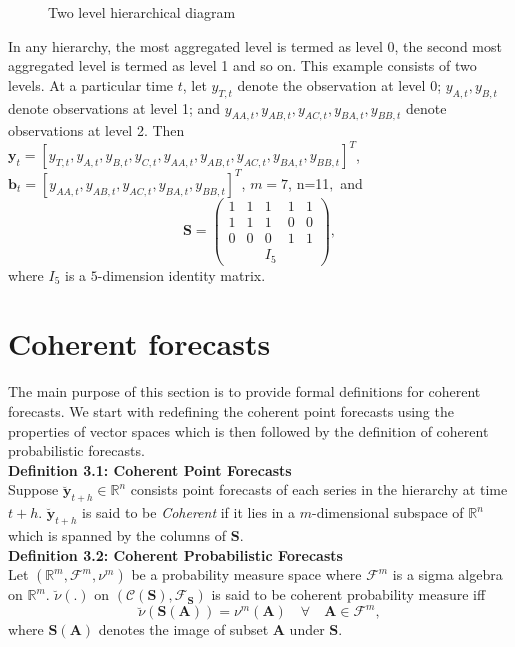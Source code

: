 \documentclass[a4paper, 11pt]{article}
\begin{document}
\begin{figure}
	\begin{center}
		  
		 
		\qobitree
	\end{center}
	\caption{Two level hierarchical diagram}
\end{figure}
\noindent
In any hierarchy, the most aggregated level is termed as level 0, the second most aggregated level is termed as level 1 and so on. This example consists of two levels. At a particular time $t$, let $y_{T,t}$ denote the observation at level 0; $y_{A,t}, y_{B,t} $ denote observations at level 1; and $y_{AA,t}, y_{AB,t}, y_{AC,t}, y_{BA,t}, y_{BB,t}$ denote observations at level 2. Then $\mathbold{y}_t = [y_{T,t},y_{A,t}, y_{B,t},y_{C,t},y_{AA,t}, y_{AB,t}, y_{AC,t}, y_{BA,t}, y_{BB,t}]^T$, \\$\mathbold{b}_t = [y_{AA,t}, y_{AB,t}, y_{AC,t}, y_{BA,t}, y_{BB,t}]^T$, $m=7$, n=11$, $ and $$ \mathbold{S} = \begin{pmatrix} 1& 1 &1 &1 &1 \\ 1 &1 &1 & 0 &0 \\   0&0 &0 & 1 & 1 \\ & & I_5 &  & \end{pmatrix}, $$ where $I_5$ is a $5$-dimension identity matrix. \\  


\section{Coherent forecasts}

The main purpose of this section is to provide formal definitions for coherent forecasts. We start with redefining the coherent point forecasts using the properties of vector spaces which is then followed by the definition of coherent probabilistic forecasts. 
\\

\noindent
\textbf{Definition 3.1: Coherent Point Forecasts}\\
\noindent
Suppose $\bm{\breve{y}}_{t+h} \in \mathbb{R}^n$ consists point forecasts of each series in the hierarchy at time $t+h$.  $\bm{\breve{y}}_{t+h}$ is said to be \textit{Coherent} if it lies in a $m$-dimensional subspace of $\bm{\mathbb{R}}^n$ which is spanned by the columns of $\bm{S}$. \\

\noindent
\textbf{Definition 3.2: Coherent Probabilistic Forecasts}\\
\noindent
Let $(\bm{\mathbb{R}}^m, \bm{\mathscr{F}}^m, \nu^m)$ be a probability measure space where $\mathscr{F}^m$ is a sigma algebra on $\bm{\mathbb{R}}^m$. $\breve{\nu}(.)$ on $(\mathscr{C}(\bm{S}), \mathscr{F}_{\bm{S}})$ is said to be coherent probability measure iff $$\breve{\nu}(\bm{S}(\bm{A})) = \nu^m(\bm{A}) \quad \forall \quad \bm{A} \in \mathscr{F}^m,$$ where $\bm{S}(\bm{A})$ denotes the image of subset $\bm{A}$ under $\bm{S}$. 
\end{document}
